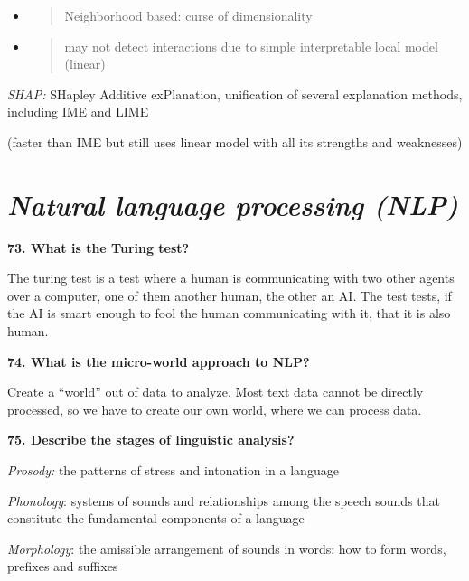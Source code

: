 \begin{itemize}
\item
  \begin{quote}
  Neighborhood based: curse of dimensionality
  \end{quote}
\end{itemize}

\begin{itemize}
\item
  \begin{quote}
  may not detect interactions due to simple interpretable local model
  (linear)
  \end{quote}
\end{itemize}

\textit{SHAP:} SHapley Additive exPlanation, unification of several
explanation methods, including IME and LIME

(faster than IME but still uses linear model with all its strengths and
weaknesses)

\hypertarget{natural-language-processing-nlp}{%
\section{\texorpdfstring{\textit{Natural language processing
(NLP)}}{Natural language processing (NLP)}}\label{natural-language-processing-nlp}}

\textbf{73. What is the Turing test?}

The turing test is a test where a human is communicating with two other
agents over a computer, one of them another human, the other an AI. The
test tests, if the AI is smart enough to fool the human communicating
with it, that it is also human.

\textbf{74. What is the micro-world approach to NLP?}

Create a ``world'' out of data to analyze. Most text data cannot be
directly processed, so we have to create our own world, where we can
process data.

\textbf{75. Describe the stages of linguistic analysis?}

\textit{Prosody:} the patterns of stress and intonation in a language

\textit{Phonology}: systems of sounds and relationships among the
speech sounds that constitute the fundamental components of a language

\textit{Morphology}: the amissible arrangement of sounds in words:
how to form words, prefixes and suffixes


